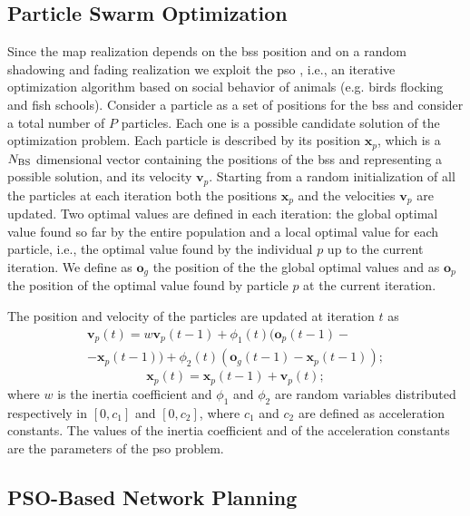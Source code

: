 \documentclass[twocolumns]{IEEEtran}
\begin{document}
\subsection{Particle Swarm Optimization}

Since the map realization depends on the \acp{bs} position and on a random shadowing and fading realization we exploit the \ac{pso} \cite{Kennedy-11}, i.e., an iterative optimization algorithm based on social behavior of animals (e.g. birds flocking and fish schools). Consider a particle as a set of positions for the \acp{bs} and consider a total number of $P$ particles. Each one is a possible candidate solution of the optimization problem. Each particle is described by its position $\bm{x}_p$, which is a $N_{\rm BS}$ dimensional vector containing the positions of the \acp{bs} and representing a possible solution, and its velocity $\bm{v}_p$.
Starting from a random initialization of all the particles at each iteration both the positions $\bm{x}_p$ and the velocities $\bm{v}_p$ are updated. Two optimal values are defined in each iteration: the global optimal value found so far by the entire population and a local optimal value for each particle, i.e., the optimal value found by the individual $p$ up to the current iteration. We define as $\bm{o}_g$ the position of the the global optimal values and as $\bm{o}_p$ the position of the optimal value found by particle $p$ at the current iteration.

The position and velocity of the particles are updated at iteration $t$ as
  \begin{equation}\label{eq: v up}
\begin{split}
  \bm{v}_p(t) = w\bm{v}_p(t-1)+\phi_1(t)(\bm{o}_p(t-1)-\\
  -\bm{x}_p(t-1))+\phi_2(t)(\bm{o}_g(t-1)-\bm{x}_p(t-1));
  \end{split}
  \end{equation}
  \begin{equation}\label{eq: p up}
  \bm{x}_p(t) = \bm{x}_p(t-1) + \bm{v}_p(t);
 \end{equation}
where $w$ is the inertia coefficient and $\phi_1$ and $\phi_2$ are random variables distributed respectively in $[0,c_1]$ and $[0,c_2]$, where $c_1$ and $c_2$ are defined as acceleration constants. The values of the inertia coefficient and of the acceleration constants are the parameters of the \ac{pso} problem.

\subsection{PSO-Based Network Planning}
\end{document}
